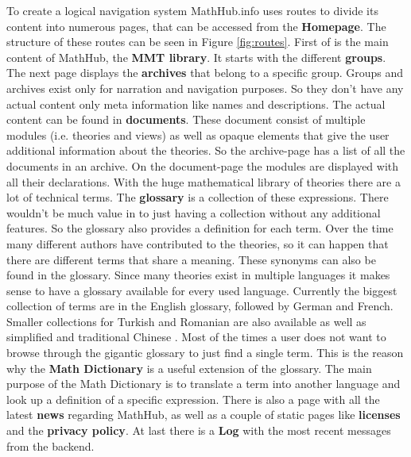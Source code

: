 \documentclass[11pt,a4paper]{article}
\begin{document}
To create a logical navigation system MathHub.info uses routes to divide its content into numerous pages, that can be accessed from the \textbf{Homepage}.
The structure of these routes can be seen in Figure \ref{fig:routes}.
\newline \newline
First of is the main content of MathHub, the \textbf{MMT library}.
It starts with the different \textbf{groups}.
The next page displays the \textbf{archives} that belong to a specific group.
Groups and archives exist only for narration and navigation purposes.
So they don't have any actual content only meta information like names and descriptions. 
The actual content can be found in \textbf{documents}.
These document consist of multiple modules (i.e. theories and views) as well as opaque elements that give the user additional information about the theories.
So the archive-page has a list of all the documents in an archive.
On the document-page the modules are displayed with all their declarations.
\newline \newline
With the huge mathematical library of theories there are a lot of technical terms.
The \textbf{glossary} is a collection of these expressions.
There wouldn't be much value in to just having a collection without any additional features.
So the glossary also provides a definition for each term.
Over the time many different authors have contributed to the theories, so it can happen that there are different terms that share a meaning.
These synonyms can also be found in the glossary.
Since many theories exist in multiple languages it makes sense to have a glossary available for every used language.
Currently the biggest collection of terms are in the English glossary, followed by German and French.
Smaller collections for Turkish and Romanian are also available as well as simplified and traditional Chinese \cite{smglom}.
\newline \newline
Most of the times a user does not want to browse through the gigantic glossary to just find a single term.
This is the reason why the \textbf{Math Dictionary} is a useful extension of the glossary.
The main purpose of the Math Dictionary is to translate a term into another language and look up a definition of a specific expression.
\newline \newline
There is also a page with all the latest \textbf{news} regarding MathHub, as well as a couple of static pages like \textbf{licenses} and the \textbf{privacy policy}.
At last there is a \textbf{Log} with the most recent messages from the backend.
\end{document}
